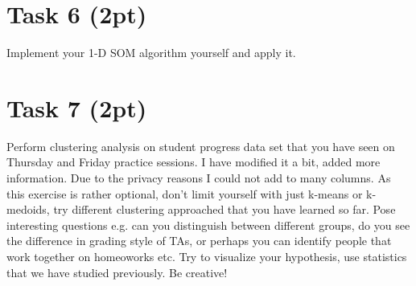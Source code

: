 \documentclass{article}
\begin{document}
\section*{Task 6 (2pt)}
Implement your 1-D SOM algorithm yourself and apply it.

\section*{Task 7 (2pt)}
Perform clustering analysis on student progress data set that you have seen on Thursday and Friday practice sessions. I have modified it a bit, added more information. Due to the privacy reasons I could not add to many columns. As this exercise is rather optional, don't limit yourself with just k-means or k-medoids, try different clustering approached that you have learned so far. Pose interesting questions e.g. can you distinguish between different groups, do you see the difference in grading style of TAs, or perhaps you can identify people that work together on homeoworks etc. Try to visualize your hypothesis, use statistics that we have studied previously. Be creative!
\end{document}
